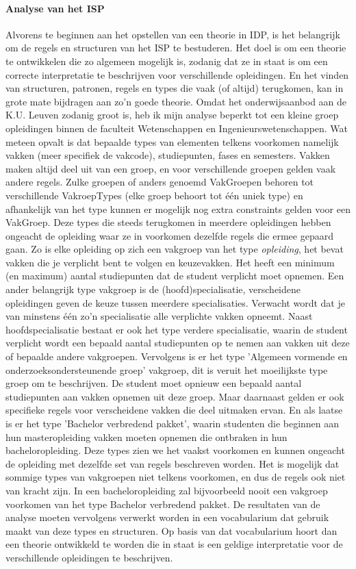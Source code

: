 \paragraph{Analyse van het ISP}
Alvorens te beginnen aan het opstellen van een theorie in IDP, is het belangrijk om de regels en structuren van het ISP te bestuderen. Het doel is om een theorie te ontwikkelen die zo algemeen mogelijk is, zodanig dat ze in staat is om een correcte interpretatie te beschrijven voor verschillende opleidingen. En het vinden van structuren, patronen, regels en types die vaak (of altijd) terugkomen, kan in grote mate bijdragen aan zo'n goede theorie. Omdat het onderwijsaanbod aan de K.U. Leuven zodanig groot is, heb ik mijn analyse beperkt tot een kleine groep opleidingen binnen de faculteit Wetenschappen en Ingenieurswetenschappen. Wat meteen opvalt is dat bepaalde types van elementen telkens voorkomen namelijk vakken (meer specifiek de vakcode), studiepunten, fases en semesters. Vakken maken altijd deel uit van een groep, en voor verschillende groepen gelden vaak andere regels. Zulke groepen of anders genoemd VakGroepen behoren tot verschillende VakroepTypes (elke groep behoort tot \'{e}\'{e}n uniek type) en afhankelijk van het type kunnen er mogelijk nog extra constraints gelden voor een VakGroep. Deze types die steeds terugkomen in meerdere opleidingen hebben ongeacht de opleiding waar ze in voorkomen dezelfde regels die ermee gepaard gaan. Zo is elke opleiding op zich een vakgroep van het type \emph{opleiding}, het bevat vakken die je verplicht bent te volgen en keuzevakken. Het heeft een minimum (en maximum) aantal studiepunten dat de student verplicht moet opnemen. Een ander belangrijk type vakgroep is de (hoofd)specialisatie, verscheidene opleidingen geven de keuze tussen meerdere specialisaties. Verwacht wordt dat je van minstens \'{e}\'{e}n zo'n specialisatie alle verplichte vakken opneemt. Naast hoofdspecialisatie bestaat er ook het type verdere specialisatie, waarin de student verplicht wordt een bepaald aantal studiepunten op te nemen aan vakken uit deze of bepaalde andere vakgroepen. Vervolgens is er het type 'Algemeen vormende en onderzoeksondersteunende groep' vakgroep, dit is veruit het moeilijkste type groep om te beschrijven. De student moet opnieuw een bepaald aantal studiepunten aan vakken opnemen uit deze groep. Maar daarnaast gelden er ook specifieke regels voor verscheidene vakken die deel uitmaken ervan. En als laatse is er het type 'Bachelor verbredend pakket', waarin studenten die beginnen aan hun masteropleiding vakken moeten opnemen die ontbraken in hun bacheloropleiding. Deze types zien we het vaakst voorkomen en kunnen ongeacht de opleiding met dezelfde set van regels beschreven worden. Het is mogelijk dat sommige types van vakgroepen niet telkens voorkomen, en dus de regels ook niet van kracht zijn. In een bacheloropleiding zal bijvoorbeeld nooit een vakgroep voorkomen van het type Bachelor verbredend pakket. De resultaten van de analyse moeten vervolgens verwerkt worden in een vocabularium dat gebruik maakt van deze types en structuren. Op basis van dat vocabularium hoort dan een theorie ontwikkeld te worden die in staat is een geldige interpretatie voor de verschillende opleidingen te beschrijven. 

